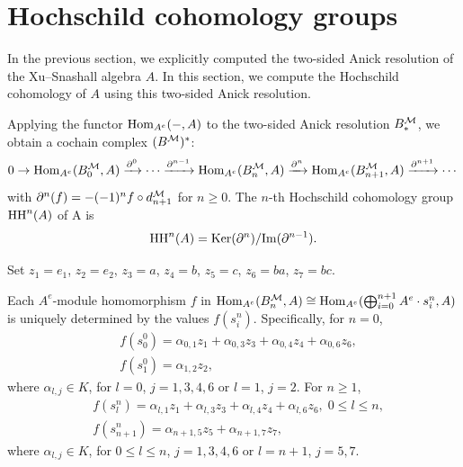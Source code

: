 \documentclass[10pt, reqno]{amsart}
\theoremstyle{definition}
\theoremstyle{remark}
\numberwithin{equation}{section}
\begin{document}

\section{Hochschild cohomology groups}\label{sec: Hochschild cohomology groups}
In the previous  section, we explicitly computed the two-sided Anick resolution of the Xu--Snashall algebra \(A\). In this section, we compute the Hochschild cohomology of \(A\)  using this two-sided Anick resolution.

Applying the functor \( \mathrm{Hom}_{A^e}(-, A) \) to the two-sided Anick resolution \(B_*^{\mathcal{M}}\), we obtain a cochain complex $(B^{\mathcal{M}})^*$:
\[ 0\rightarrow \mathrm{Hom}_{A^e}(B_0^{\mathcal{M}}, A)\xrightarrow{\partial^0}\cdots\xrightarrow{\partial^{n-1}} \mathrm{Hom}_{A^e}(B_n^{\mathcal{M}}, A)\xrightarrow{\partial^n}\mathrm{Hom}_{A^e}(B_{n+1}^{\mathcal{M}}, A) \xrightarrow{\partial^{n+1}} \cdots \]
with $\partial^n(f)=-(-1)^n f\circ d_{n+1}^{\mathcal{M}}$ for $n\ge 0$.
The \(n\)-th Hochschild cohomology group \(\mathrm{HH}^n(A)\) of A is
\[\mathrm{HH}^n(A)= \mathrm{Ker}( \partial^n) / \mathrm{Im}( \partial^{n-1} ). \]

Set $z_1=e_1$, $z_2=e_2$, $z_3=a$, $z_4=b$, $z_5=c$, $z_6=ba$, $z_7=bc$.

Each \(A^e\)-module homomorphism \(f \) in \(\mathrm{Hom}_{A^e}(B_n^{\mathcal{M}}, A)\cong \mathrm{Hom}_{A^e}(\bigoplus_{i=0}^{n+1} A^e \cdot s_i^n, A)\) is uniquely determined by the values \(f(s_i^n)\). Specifically, for \(n=0\),
\begin{equation}\label{euq: degree 0 homomorphisn}
    \begin{aligned}
    &f(s_0^0)= \alpha_{0,1} z_1+ \alpha_{0,3} z_3+ \alpha_{0,4} z_4+ \alpha_{0,6} z_6,\\
    &f(s_1^0)= \alpha_{1,2} z_2,
\end{aligned}
\end{equation}
where \(\alpha_{l,j} \in K\), for $l=0$, $j=1,3,4,6$ or $l=1$, $j=2$.
For \(n\ge 1\),
\begin{equation}\label{euq: degree n homomorphisn}
    \begin{aligned}
    &f(s_{l}^n)= \alpha_{l,1} z_1+ \alpha_{l,3} z_3+ \alpha_{l,4} z_4+ \alpha_{l,6} z_6, \; 0\le l \le n,\\
    &f(s_{n+1}^n)= \alpha_{n+1,5} z_5+ \alpha_{n+1,7} z_7,
\end{aligned}
\end{equation}
where \(\alpha_{l,j} \in K\), for $ 0\le l \le n$, $j=1,3,4,6$ or $l=n+1$, $j=5,7$.
\end{document}
